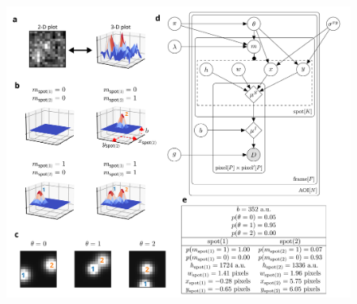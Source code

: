 \begin{figure}[t]
\centering
\includegraphics[width=\textwidth]{figures/figure2/figure2.png}
\label{fig:tapqir_model}
\end{figure}

